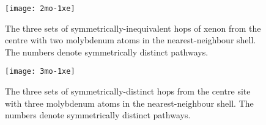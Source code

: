 \begin{figure}
    \centering
    \texttt{[image: 2mo-1xe]}
    \caption{The three sets of symmetrically-inequivalent hops of xenon from the centre
        with two molybdenum atoms in the nearest-neighbour shell.
        The numbers denote symmetrically distinct pathways.}
    \label{figure02}
\end{figure}

\begin{figure}
    \centering
    \texttt{[image: 3mo-1xe]}
    \caption{The three sets of symmetrically-distinct hops from the centre site
        with three molybdenum atoms in the nearest-neighbour shell. The numbers denote symmetrically distinct pathways.}
    \label{figure03}
\end{figure}

